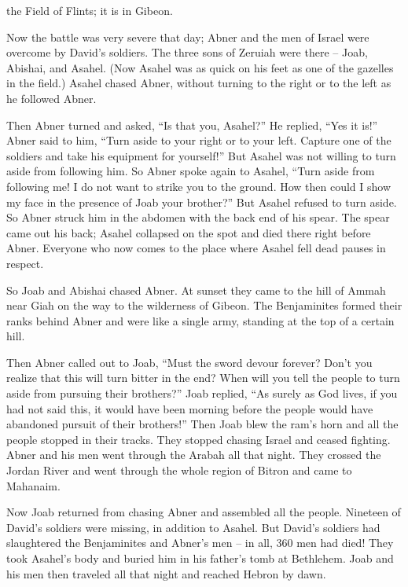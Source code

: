 {the Field of Flints;
it is in Gibeon.
\par }{\PP {}Now
the battle
was very
severe
that day;
Abner
and the men
of Israel
were overcome
by David’s
soldiers.
The three
sons
of Zeruiah
were
there
– Joab,
Abishai,
and Asahel.
(Now Asahel
was as quick
on his feet
as one
of the gazelles
in the field.)
Asahel
chased
Abner,
without
turning
to the right
or to the left
as he followed
Abner.
\par }{\PP {}Then Abner
turned
and asked,
“Is that you,
Asahel?” He replied, “Yes it is!”
Abner
said
to him, “Turn aside
to
your right
or
to your left.
Capture
one
of the soldiers
and take
his equipment
for yourself!” But Asahel
was not
willing
to turn aside
from following him.
So
Abner
spoke
again
to
Asahel,
“Turn aside
from following
me! I do not want
to strike
you to the ground.
How
then could I show
my face in the presence
of Joab
your brother?”
But Asahel refused
to turn aside.
So Abner
struck
him in the abdomen
with the back
end of his spear.
The spear
came out
his back; Asahel
collapsed
on the spot
and died
there
right before
Abner. Everyone
who now comes
to
the place
where
Asahel
fell
dead
pauses in respect.
\par }{\PP {}So Joab
and Abishai
chased
Abner.
At sunset
they
came
to
the hill
of Ammah
near Giah
on
the way
to the wilderness
of Gibeon.
The Benjaminites
formed their ranks
behind
Abner
and were
like a single
army,
standing
at
the top
of a certain
hill.
\par }{\PP {}Then Abner
called out
to
Joab,
“Must the sword
devour
forever? Don’t
you realize
that
this will turn
bitter
in the end? When
will you tell
the people
to turn
aside from pursuing
their brothers?”
Joab
replied,
“As surely
as God
lives, if
you had not
said
this,
it would have been morning
before
the people
would have abandoned pursuit of their brothers!”
Then Joab
blew
the ram’s horn
and all
the people
stopped in their tracks. They stopped chasing
Israel
and ceased
fighting.
Abner
and his men
went through
the Arabah
all
that night.
They crossed
the
Jordan River
and went through
the whole
region of Bitron
and came
to Mahanaim.
\par }{\PP {}Now Joab
returned
from chasing
Abner
and assembled
all
the people.
Nineteen
of David’s
soldiers
were missing,
in addition to Asahel.
But David’s
soldiers
had slaughtered
the Benjaminites
and Abner’s
men
– in all, 360
men
had died!
They took
Asahel’s
body and buried
him in his father’s
tomb
at Bethlehem.
Joab
and his men
then traveled
all
that night
and reached Hebron
by dawn.

}

